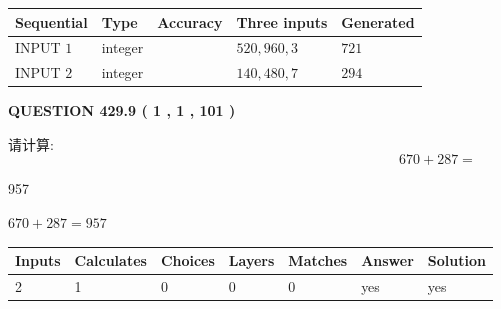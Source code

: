 \documentclass{ctexart}
\begin{document}
   
  
  
\noindent\begin{tabular}{|l|l|l|l|l|}
\hline
 Sequential & Type & Accuracy & Three inputs & Generated \\ 
\hline
 
 
  INPUT $  1 $ & integer &  & $
 520
 , 
 960
 , 
 3
 $ & $ 721 $ 
 \\  \hline  
 
 
  INPUT $  2 $ & integer &  & $
 140
 , 
 480
 , 
 7
 $ & $ 294 $ 
 \\  \hline  
 \end{tabular}
   
   
  
\vspace{0.2in}
  
{\textbf{\Large{QUESTION
429.9 
 ( 1 , 1 , 101 )
}}}
  
  
 
请计算:
\begin{equation}
670 +  %
287 = \nonumber
\end{equation}
 
 
 
\noindent{}
 
 

957
 
 
\noindent{}
 
 

 
 
 
\noindent{}
 
 

$ %
670 +  %
287=   %
957$
 
 
\noindent{}
 
 

 
   
   
   
   
\noindent\begin{tabular}{|l|l|l|l|l|l|l|}
 \hline
Inputs & Calculates & Choices & Layers & Matches & Answer & Solution \\ \hline
 2  & 
 1  & 
 0
  & 
 0  & 
 0  & 
  yes & 
  yes 
  \\ \hline
 \end{tabular}
   
\end{document}
